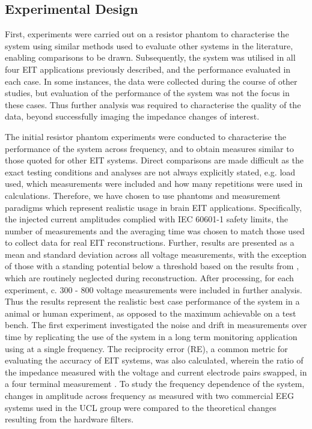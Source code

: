 \subsection{Experimental Design}

First, experiments were carried out on a resistor phantom to characterise the system using similar methods  used to evaluate other systems in the literature, enabling comparisons to be drawn. Subsequently, the system was utilised in all four EIT applications previously described, and the performance evaluated in each case. In some instances, the data were collected during the course of other studies, but evaluation of the performance of the system was not the focus in these cases. Thus further analysis was required to characterise the quality of the data, beyond successfully imaging the impedance changes of interest. 

The initial resistor phantom experiments were conducted to characterise the performance of the system across frequency, and to obtain measures similar to those quoted for other EIT systems. Direct comparisons are made difficult as the exact testing conditions and analyses are not always explicitly stated, e.g. load used, which measurements were included and how many repetitions were used in calculations. Therefore, we have chosen to use phantoms and measurement paradigms which represent realistic usage in brain EIT applications. Specifically, the injected current amplitudes complied with IEC 60601-1 \cite{IEC} safety limits, the number of measurements and the averaging time was chosen to match those used to collect data for real EIT reconstructions. Further, results are presented as a mean and standard deviation across all voltage measurements, with the exception of those with a standing potential below a threshold based on the results from \citet{packham2012comparison}, which are routinely neglected during reconstruction. After processing, for each experiment, c. 300 - 800 voltage measurements were included in further analysis. Thus the results represent the realistic best case performance of the system in a animal or human experiment, as opposed to the maximum achievable on a test bench. The first experiment investigated the noise and drift in measurements over time by replicating the use of the system in a long term monitoring application using at a single frequency. The reciprocity error (RE), a common metric for evaluating the accuracy of EIT systems, was also calculated, wherein the ratio of the impedance measured with the voltage and current electrode pairs swapped, in a four terminal measurement \cite{Hun_Wi_2014}. To study the frequency dependence of the system, changes in amplitude across frequency as measured with two commercial EEG systems used in the UCL group were compared to the theoretical changes resulting from the hardware filters. 

